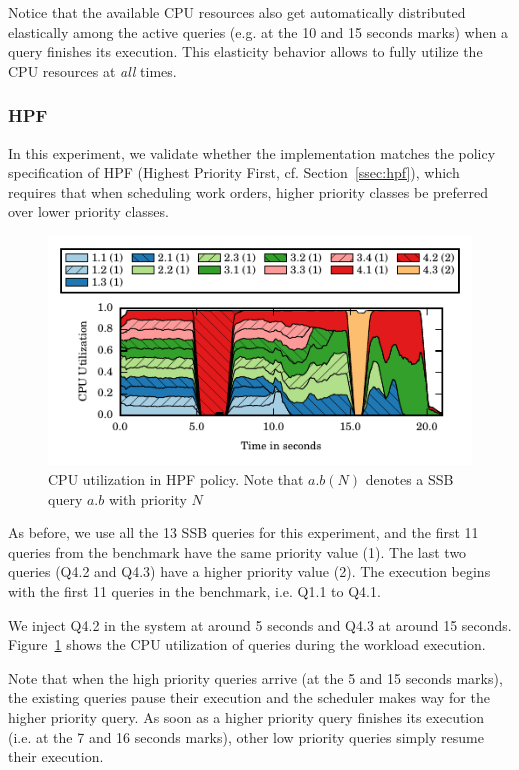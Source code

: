 Notice that the available CPU resources also get automatically distributed elastically among the active 
queries (e.g. at the 10 and 15 seconds marks) when a query finishes its execution. 
This elasticity behavior allows \sys{} to fully utilize the CPU resources at \textit{all} times.
\subsubsection{HPF}
In this experiment, we validate whether the implementation matches the policy 
specification of HPF (Highest Priority First, cf. Section~\ref{ssec:hpf}),
which requires that when scheduling work orders, higher priority classes be 
preferred over lower priority classes. 

\begin{figure}[b]
	\centering
	\includegraphics[width=\columnwidth]{figures/ssb-hpf-all.pdf}
	\vspace{-2.5em}
	\caption{CPU utilization in HPF policy. Note that $a.b  (N)$ denotes a SSB query $a.b$ with priority $N$}
	\vspace{-1em}
	\label{fig:hpf-all}
\end{figure}

As before, we use all the 13 SSB queries for this experiment, and the first 11 queries from the benchmark have the same priority value (1).
The last two queries (Q4.2 and Q4.3) have a higher priority value (2). 
The execution begins with the first 11 queries in the benchmark, i.e. Q1.1 to Q4.1.

We inject Q4.2 in the system at around 5 seconds and Q4.3 at around 15 seconds.
Figure~\ref{fig:hpf-all} shows the CPU utilization of queries during the workload 
execution.

Note that when the high priority queries arrive (at the 5 and 15 seconds marks), the existing queries pause their execution and the scheduler makes way for the higher priority query.
As soon as a higher priority query finishes its execution (i.e. at the 7 and 16 seconds marks), other low priority queries simply resume their execution.

